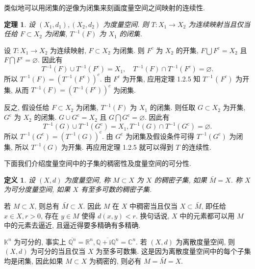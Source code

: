 \documentclass[openany]{ctexbook}
\makeatletter
\theoremstyle{kaiti}
\newtheorem{definition}{定义}[section]
\newtheorem{theorem}{定理}[section]
\theoremstyle{normal}
\renewenvironment{proof}[1][\proofname]{\par
    \pushQED{\qed}%
    \normalfont \topsep6\p@\@plus6\p@\relax
    \trivlist
    \item\relax
    {\heiti #1}\hspace{2\labelsep}\ignorespaces
  }{%
    \popQED\endtrivlist\@endpefalse
  }
\makeatother
\begin{document}
类似地可以用闭集的逆像为闭集来刻画度量空间之间映射的连续性.

\begin{theorem}
  设 $\left(X_1, d_1\right),\left(X_2, d_2\right)$ 为度量空间. 则 $T: X_1 \rightarrow X_2$ 为连续映射当且仅当任给 $F \subset X_2$ 为闭集, $T^{-1}(F)$ 为 $X_1$ 的闭集.
\end{theorem}

\begin{proof}
设 $T: X_1 \rightarrow X_2$ 为连续映射, $F \subset X_2$ 为闭集. 则 $F^{c}$ 为 $X_2$ 的开集, $F \bigcup F^{\mathrm{c}}=X_2$ 且 $F \bigcap F^{c}=\varnothing$. 因此有
$$
T^{-1}(F) \cup T^{-1}\left(F^{c}\right)=X_1, \quad T^{-1}(F) \cap T^{-1}\left(F^{c}\right)=\varnothing.
$$
所以 $T^{-1}(F)=\left(T^{-1}\left(F^{c}\right)\right)^{c}$. 由 $F^{c}$ 为开集, 应用定理 1.2.5 知 $T^{-1}$ ( $\left.F^{c}\right)$ 为开集, 从而 $T^{-1}(F)=\left(T^{-1}\left(F^{c}\right)\right)^{c}$ 为闭集.

反之, 假设任给 $F \subset X_2$ 为闭集, $T^{-1}(F)$ 为 $X_1$ 的闭集. 则任取 $G \subset X_2$ 为开集, $G^{\mathrm{c}}$ 为 $X_2$ 的闭集. $G \cup G^{\mathrm{c}}=X_2$ 且 $G \bigcap G^{\mathrm{c}}=\varnothing$. 因此有
$$
T^{-1}(G) \cup T^{-1}\left(G^{\mathrm{c}}\right)=X_1, T^{-1}(G) \cap T^{-1}\left(G^{\mathrm{c}}\right)=\varnothing.
$$
所以 $T^{-1}\left(G^{\mathrm{c}}\right)=\left(T^{-1}(G)\right)^{\mathrm{c}}$. 由 $G^{\mathrm{c}}$ 为闭集及假设条件可得 $T^{-1}\left(G^{\mathrm{c}}\right)$ 为闭集, 所以 $T^{-1}(G)$ 为开集. 再应用定理 1.2.5 就可以得到 $T$ 的连续性.
\end{proof}

下面我们介绍度量空间中的子集的稠密性及度量空间的可分性.

\begin{definition}
  设 $(X, d)$ 为度量空间, 称 $M \subset X$ 为 $X$ 的稠密子集, 如果 $\bar{M}=X$. 称 $X$ 为可分度量空间, 如果 $X$ 有至多可数的稠密子集.
\end{definition}

若 $M \subset X$, 则总有 $\bar{M} \subset X$. 因此 $M$ 在 $X$ 中稠密当且仅当 $X \subset \bar{M}$, 即任给 $x \in X, r>0$, 存在 $y \in M$ 使得 $d(x, y)<r$. 换句话说, $X$ 中的元素都可以用 $M$ 中的元素去逼近, 且逼近得要多精确有多精确.

$\mathbb{K}^n$ 为可分的, 事实上 $\overline{\mathbb{Q}^n}=\mathbb{R}^n, \overline{\mathbb{Q}+\mathrm{i} \mathbb{Q}^n}=\mathbb{C}^n$. 若 $(X, d)$ 为离散度量空间, 则 $(X, d)$ 为可分的当且仅当 $X$ 为至多可数集. 这是因为离散度量空间中的每个子集均是闭集, 因此如果 $M \subset X$ 为稠密的, 则必有 $M=\bar{M}=X$.
\end{document}

